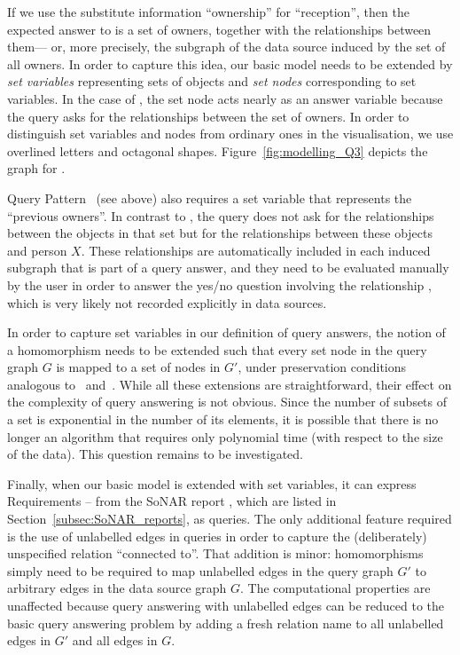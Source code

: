 If we use the substitute information \enquote{ownership} for \enquote{reception},
then the expected answer to  is a set of owners,
together with the relationships between them---%
or, more precisely, the subgraph of the data source induced by the set of all owners.
In order to capture this idea,
our basic model needs to be extended by \emph{set variables} representing sets of objects
and \emph{set nodes} corresponding to set variables.
In the case of , the set node acts nearly as an answer variable
because the query asks for the relationships between the set of owners.
In order to distinguish set variables and nodes from ordinary ones in the visualisation,
we use overlined letters and octagonal shapes.
Figure~\ref{fig:modelling_Q3} depicts the graph for .

Query Pattern~ (see above) also requires a set variable
that represents the \enquote{previous owners}. In contrast to ,
the query does not ask for the relationships between the objects in that set
but for the relationships between these objects and person $X$.
These relationships are automatically included in each induced subgraph that is part of a query answer,
and they need to be evaluated manually by the user
in order to answer the yes/no question involving the relationship ,
which is very likely not recorded explicitly in data sources.

In order to capture set variables in our definition of query answers,
the notion of a homomorphism needs to be extended such that
every set node in the query graph $G$ is mapped to a set of nodes in $G'$,
under preservation conditions analogous to~ and~.
While all these extensions are straightforward,
their effect on the complexity of query answering is not obvious.
Since the number of subsets of a set is exponential in the number of its
elements, it is possible that there is no longer an algorithm
that requires only polynomial time (with respect to the size of the data).
This question remains to be investigated.

Finally, when our basic model is extended with set variables,
it can express Requirements -- from the 
SoNAR report \autocite{Fangerau2022}, which are listed in Section~\ref{subsec:SoNAR_reports},
as queries.
The only additional feature required is the use of unlabelled edges in queries
in order to capture the (deliberately) unspecified relation \enquote{connected to}.
That addition is minor: homomorphisms simply need to be required to map unlabelled
edges in the query graph $G'$ to arbitrary edges in the data source graph $G$.
The computational properties are unaffected because 
query answering with unlabelled edges can be reduced to the basic query answering problem
by adding a fresh relation name to all unlabelled edges in $G'$ and all edges in $G$.


